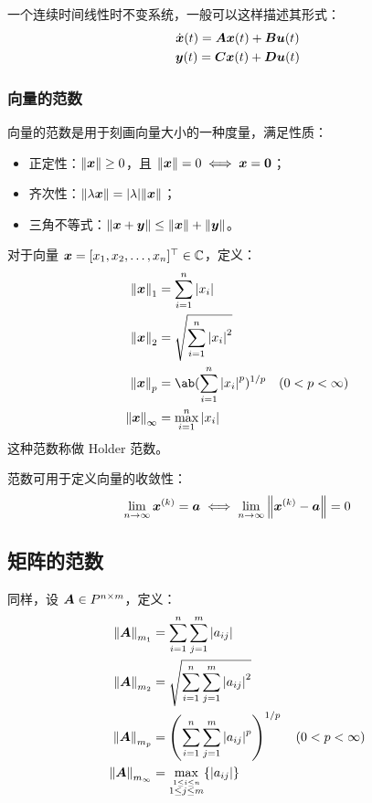 一个连续时间线性时不变系统，一般可以这样描述其形式：
$$
\begin{gathered}
    \dot{\boldsymbol{x}}(t) = \boldsymbol{A} \boldsymbol{x}(t) + \boldsymbol{B} \boldsymbol{u}(t) \\
    \boldsymbol{y}(t) = \boldsymbol{C} \boldsymbol{x}(t) + \boldsymbol{D} \boldsymbol{u}(t)
\end{gathered}
$$

\subsubsection{向量的范数}

向量的范数是用于刻画向量大小的一种度量，满足性质：

\begin{itemize}
    \item 正定性：$\norm{\boldsymbol{x}} \ge 0$，且 $\norm{\boldsymbol{x}} = 0 \iff \boldsymbol{x} = \boldsymbol{0}$；
    \item 齐次性：$\norm{\lambda \boldsymbol{x}} = \abs{\lambda} \norm{\boldsymbol{x}}$；
    \item 三角不等式：$\norm{\boldsymbol{x} + \boldsymbol{y}} \le \norm{\boldsymbol{x}} + \norm{\boldsymbol{y}}$。
\end{itemize}

对于向量 $\boldsymbol{x} = [x_1, x_2,\dots, x_n]^\top \in \mathbb{C}$，定义：
$$
\begin{aligned}
    \norm{\vect{x}}_1 & = \sum_{i=1}^n \abs{x_i} \\
    \norm{\vect{x}}_2 & = \sqrt{\sum_{i=1}^n \abs{x_i}^2} \\
    \norm{\vect{x}}_p & = \ab(\sum_{i=1}^n \abs{x_i}^p)^{1/p} \quad (0 < p < \infty) \\
    \norm{\vect{x}}_\infty & = \max_{i=1}^n \abs{x_i}
\end{aligned}
$$
这种范数称做 Holder 范数。

范数可用于定义向量的收敛性：
$$
\lim_{n \to \infty} \boldsymbol{x}^{(k)} = \boldsymbol{a} \iff \lim_{n \to \infty} \norm{\boldsymbol{x}^{(k)} - \boldsymbol{a}} = 0
$$

\subsection{矩阵的范数}

同样，设 $\boldsymbol{A} \in P^{n \times m}$，定义：
$$
\begin{aligned}
    \norm{\boldsymbol{A}}_{m_1} & = \sum_{i=1}^n \sum_{j=1}^m \abs{a_{ij}} \\
    \norm{\boldsymbol{A}}_{m_2} & = \sqrt{\sum_{i=1}^n \sum_{j=1}^m \abs{a_{ij}}^2} \\
    \norm{\boldsymbol{A}}_{m_p} & = \left( \sum_{i=1}^n \sum_{j=1}^m \abs{a_{ij}}^p \right)^{1/p} \quad (0 < p < \infty) \\
    \norm{\boldsymbol{A}}_{m_\infty} & = \max_{\stackrel{1 \le i \le n}{1 \le j \le m}} \{\abs{a_{ij}}\}
\end{aligned}
$$

